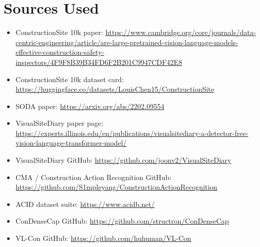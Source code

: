 \documentclass[10pt]{article}
\begin{document}
\section{Sources Used}
\begin{itemize}
  \item ConstructionSite 10k paper: \url{https://www.cambridge.org/core/journals/data-centric-engineering/article/are-large-pretrained-vision-language-models-effective-construction-safety-inspectors/4F9F8B39B34FD6F2B201C9947CDF42E8}
  \item ConstructionSite 10k dataset card: \url{https://huggingface.co/datasets/LouisChen15/ConstructionSite}
  \item SODA paper: \url{https://arxiv.org/abs/2202.09554}
  \item VisualSiteDiary paper page: \url{https://experts.illinois.edu/en/publications/visualsitediary-a-detector-free-vision-language-transformer-model/}
  \item VisualSiteDiary GitHub: \url{https://github.com/joonv2/VisualSiteDiary}
  \item CMA / Construction Action Recognition GitHub: \url{https://github.com/S1mpleyang/ConstructionActionRecognition}
  \item ACID dataset suite: \url{https://www.acidb.net/}
  \item ConDenseCap GitHub: \url{https://github.com/structron/ConDenseCap}
  \item VL-Con GitHub: \url{https://github.com/huhuman/VL-Con}
\end{itemize}
\end{document}
